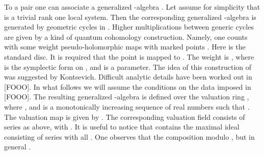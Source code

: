 \documentclass[a4paper,12pt]{article}
\begin{document}
To a pair \coordHE{} one can associate a generalized \myHighlight{$\A$}\coordHE{}-algebra
\coordHE{}. Let assume for simplicity that \myHighlight{$\rho$}\coordHE{} is a trivial
rank one local system. Then the corresponding generalized \myHighlight{$\A$}\coordHE{}-algebra \coordHE{}
is generated by geometric cycles in \coordHE{}. Higher multiplications
\coordHE{} between generic cycles \coordHE{} are
given by a kind of quantum cohomology construction. Namely,
one counts with some weight 
pseudo-holomorphic maps \coordHE{} 
with marked points \coordHE{}.
Here \coordHE{} is the standard disc. It is required 
that the point \coordHE{} is mapped to \coordHE{}. The weight is
\coordHE{}, where
\myHighlight{$\omega$}\coordHE{} is the symplectic form on \coordHE{}, and \myHighlight{$\epsilon$}\coordHE{} is a parameter.
The idea of this construction of \coordHE{} was suggested by Kontsevich.
Difficult analytic details have been worked out in [FOOO].
In what follows we will assume the conditions on the data imposed in  [FOOO]. 
The resulting generalized \myHighlight{$\A$}\coordHE{}-algebra \coordHE{} is defined
over the valuation ring 
\coordHE{},
where \coordHE{},
and \coordHE{} is a monotonically increasing sequence of real
numbers such that \coordHE{}.
The valuation map is given by \coordHE{}.
The corresponding valuation field \myHighlight{$\C_{\epsilon}$}\coordHE{} consists of series \coordHE{}
as above,
with \coordHE{}. It is useful to notice
that \coordHE{} contains the maximal ideal 
\coordHE{} consisting
of series with all \coordHE{}.
One observes that the composition \coordHE{} modulo \coordHE{}, but in general
\coordHE{}.
\end{document}
